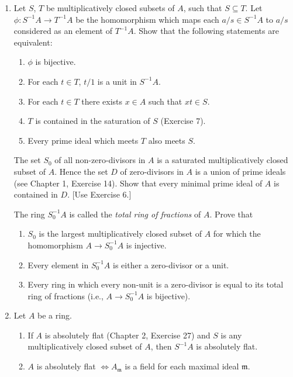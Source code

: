 \begin{enumerate}
\item Let $S$, $T$ be multiplicatively closed subsets of $A$, such that $S\subseteq T$. Let $\phi:S^{-1}A\longrightarrow T^{-1}A$ be the homomorphism which maps each $a/s\in S^{-1}A$ to $a/s$ considered as an element of $T^{-1}A$. Show that the following statements are equivalent:
\begin{enumerate}
\renewcommand{\labelenumii}{\roman{enumii})}
\item $\phi$ is bijective.
\item For each $t\in T$, $t/1$ is a unit in $S^{-1}A$.
\item For each $t\in T$ there exists $x\in A$ such that $xt\in S$.
\item $T$ is contained in the saturation of $S$ (Exercise 7).
\item Every prime ideal which meets $T$ also meets $S$.
\end{enumerate}

\amstaritem The set $S_0$ of all non-zero-divisors in $A$ is a saturated multiplicatively closed subset of $A$. Hence the set $D$ of zero-divisors in $A$ is a union of prime ideals (see Chapter 1, Exercise 14). Show that every minimal prime ideal of $A$ is contained in $D$. [Use Exercise 6.]

The ring $S_0^{-1}A$ is called the \textit{total ring of fractions} of $A$. Prove that
\begin{enumerate}
\renewcommand{\labelenumii}{\roman{enumii})}
\item $S_0$ is the largest multiplicatively closed subset of $A$ for which the homomorphism $A\longrightarrow S_0^{-1}A$ is injective.
\item Every element in $S_0^{-1}A$ is either a zero-divisor or a unit.
\item Every ring in which every non-unit is a zero-divisor is equal to its total ring of fractions (i.e., $A\longrightarrow S_0^{-1}A$ is bijective).
\end{enumerate}

\item Let $A$ be a ring.
\begin{enumerate}
\renewcommand{\labelenumii}{\roman{enumii})}
\item If $A$ is absolutely flat (Chapter 2, Exercise 27) and $S$ is any multiplicatively closed subset of $A$, then $S^{-1}A$ is absolutely flat.
\item $A$ is absolutely flat $\Longleftrightarrow A_{\mathfrak m}$ is a field for each maximal ideal $\mathfrak m$.
\end{enumerate}


\end{enumerate}
